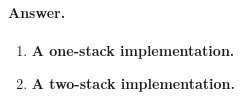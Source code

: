 \paragraph{Answer.}

\begin{enumerate}

  \item \textbf{A one-stack implementation.}
    {\small}

  \item \textbf{A two-stack implementation.}
    {\small}

\end{enumerate}

